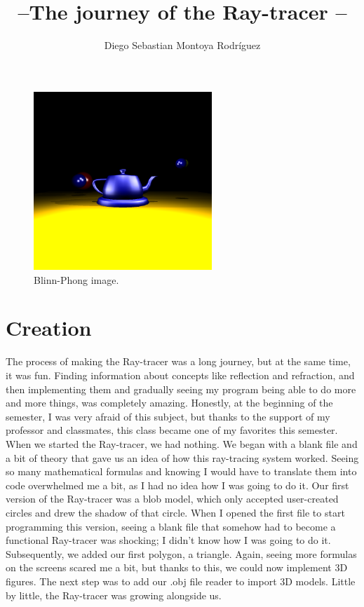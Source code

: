 \documentclass[12pt]{article}
\title{ --The journey of the Ray-tracer -- }
\author{Diego Sebastian Montoya Rodríguez}
\begin{document}
	
	\maketitle
	\vspace{10pt} %
	
	\begin{figure}[h]
		\centering
		\includegraphics[width=0.6\textwidth]{image7.png}
		\caption{Blinn-Phong image.}
		\label{fig:ejemplo}

	\end{figure}
			\pagebreak
	\section{Creation}
	
	The process of making the Ray-tracer was a long journey, but at the same time, it was fun. Finding information about concepts like reflection and refraction, and then implementing them and gradually seeing my program being able to do more and more things, was completely amazing. Honestly, at the beginning of the semester, I was very afraid of this subject, but thanks to the support of my professor and classmates, this class became one of my favorites this semester.\\
	
	When we started the Ray-tracer, we had nothing. We began with a blank file and a bit of theory that gave us an idea of how this ray-tracing system worked. Seeing so many mathematical formulas and knowing I would have to translate them into code overwhelmed me a bit, as I had no idea how I was going to do it. Our first version of the Ray-tracer was a blob model, which only accepted user-created circles and drew the shadow of that circle. When I opened the first file to start programming this version, seeing a blank file that somehow had to become a functional Ray-tracer was shocking; I didn’t know how I was going to do it. Subsequently, we added our first polygon, a triangle. Again, seeing more formulas on the screens scared me a bit, but thanks to this, we could now implement 3D figures. The next step was to add our .obj file reader to import 3D models. Little by little, the Ray-tracer was growing alongside us.\\
	
\end{document}
